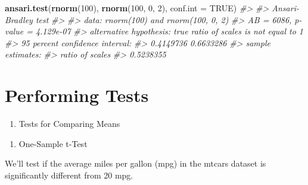 \documentclass[
]{book}
\newenvironment{Shaded}{\begin{snugshade}}{\end{snugshade}}
\newcommand{\AttributeTok}[1]{\textcolor[rgb]{0.13,0.29,0.53}{#1}}
\newcommand{\CommentTok}[1]{\textcolor[rgb]{0.56,0.35,0.01}{\textit{#1}}}
\newcommand{\ConstantTok}[1]{\textcolor[rgb]{0.56,0.35,0.01}{#1}}
\newcommand{\DecValTok}[1]{\textcolor[rgb]{0.00,0.00,0.81}{#1}}
\newcommand{\FunctionTok}[1]{\textcolor[rgb]{0.13,0.29,0.53}{\textbf{#1}}}
\newcommand{\NormalTok}[1]{#1}
\newcommand{\SpecialCharTok}[1]{\textcolor[rgb]{0.81,0.36,0.00}{\textbf{#1}}}
\providecommand{\tightlist}{%
  \setlength{\itemsep}{0pt}\setlength{\parskip}{0pt}}
\begin{document}
\begin{Shaded}
\begin{Highlighting}[]
\FunctionTok{ansari.test}\NormalTok{(}\FunctionTok{rnorm}\NormalTok{(}\DecValTok{100}\NormalTok{), }\FunctionTok{rnorm}\NormalTok{(}\DecValTok{100}\NormalTok{, }\DecValTok{0}\NormalTok{, }\DecValTok{2}\NormalTok{), }\AttributeTok{conf.int =} \ConstantTok{TRUE}\NormalTok{)}
\CommentTok{\#\textgreater{} }
\CommentTok{\#\textgreater{}  Ansari{-}Bradley test}
\CommentTok{\#\textgreater{} }
\CommentTok{\#\textgreater{} data:  rnorm(100) and rnorm(100, 0, 2)}
\CommentTok{\#\textgreater{} AB = 6086, p{-}value = 4.129e{-}07}
\CommentTok{\#\textgreater{} alternative hypothesis: true ratio of scales is not equal to 1}
\CommentTok{\#\textgreater{} 95 percent confidence interval:}
\CommentTok{\#\textgreater{}  0.4149736 0.6633286}
\CommentTok{\#\textgreater{} sample estimates:}
\CommentTok{\#\textgreater{} ratio of scales }
\CommentTok{\#\textgreater{}       0.5238355}
\end{Highlighting}
\end{Shaded}

\section*{Performing Tests}\label{performing-tests}

\begin{enumerate}
\def\labelenumi{\arabic{enumi}.}
\tightlist
\item
  Tests for Comparing Means
\end{enumerate}

\begin{enumerate}
\def\labelenumi{\alph{enumi}.}
\tightlist
\item
  One-Sample t-Test
\end{enumerate}

We'll test if the average miles per gallon (mpg) in the mtcars dataset is significantly different from 20 mpg.

\begin{Shaded}
\end{Shaded}
\end{document}
